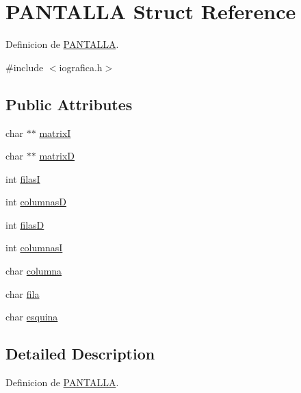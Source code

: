 \hypertarget{structPANTALLA}{
\section{PANTALLA Struct Reference}
\label{structPANTALLA}
}


Definicion de \hyperlink{structPANTALLA}{PANTALLA}.  




{\ttfamily \#include $<$iografica.h$>$}

\subsection*{Public Attributes}
\begin{DoxyCompactItemize}
\item 
char $\ast$$\ast$ \hyperlink{structPANTALLA_acd92ea589583ead084c96f500ca35254}{matrixI}
\item 
char $\ast$$\ast$ \hyperlink{structPANTALLA_a54813792def91e4ea9551a39c209b856}{matrixD}
\item 
int \hyperlink{structPANTALLA_ae8d1b50a99bfad0fda834696535d283d}{filasI}
\item 
int \hyperlink{structPANTALLA_a56ca91dd3cbe1365864d4a6fda66bbb5}{columnasD}
\item 
int \hyperlink{structPANTALLA_ae07add488982084fa27b05836c5bcaf2}{filasD}
\item 
int \hyperlink{structPANTALLA_af35fa7c9120679d5ede24491d93a07c0}{columnasI}
\item 
char \hyperlink{structPANTALLA_ad8dd2cd0946ef322134cb764c429f65f}{columna}
\item 
char \hyperlink{structPANTALLA_aa48180c68b4bae25a55f5ee460e3fd33}{fila}
\item 
char \hyperlink{structPANTALLA_aa258b985a8d4e573fa0ac7406cda3742}{esquina}
\end{DoxyCompactItemize}


\subsection{Detailed Description}
Definicion de \hyperlink{structPANTALLA}{PANTALLA}. 

